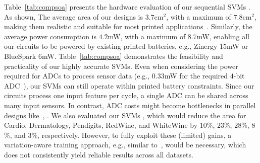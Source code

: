 Table~\ref{tab:compsoa} presents the hardware evaluation of our sequential SVMs .
As shown, 
The average area of our designs is $3.7$cm$^2$, with a maximum of $7.8$cm$^2$, making them realistic and suitable for most printed applications~\cite{Armeniakos:TCAD2023:cross}. 
Similarly, the average power consumption is $4.2$mW, with a maximum of $8.7$mW, enabling all our circuits to be powered by existing printed batteries, e.g., Zinergy $15$mW or BlueSpark $6$mW.
Table~\ref{tab:compsoa} demonstrates the feasibility and practicality of our highly accurate SVMs.
Even when considering the power required for ADCs to process sensor data (e.g., $0.33$mW for the required $4$-bit ADC~\cite{Bleier:ISCA:2020:printedml}), our SVMs can still operate within printed battery constraints.
Since our circuits process one input feature per cycle, a single ADC can be shared across many input sensors.
In contrast, ADC costs might become bottlenecks in parallel designs like~\cite{Mubarik:MICRO:2020:printedml, Armeniakos:TCAD2023:cross, Armeniakos:TC2023:codesign}, .
We also evaluated our SVMs , which would reduce the area for Cardio, Dermatology, Pendigits, RedWine, and WhiteWine by $10$\%, $23$\%, $28$\%, $8$\%, and $3$\%, respectively.
However, to fully exploit these (limited) gains, a variation-aware training approach, e.g., similar to~\cite{Zhao:DATE2023}, would be necessary, which does not consistently yield reliable results across all datasets.




